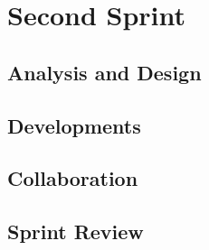 \chapter{Second Sprint}


\section{Analysis and Design}

\section{Developments}

\section{Collaboration}

\section{Sprint Review}
